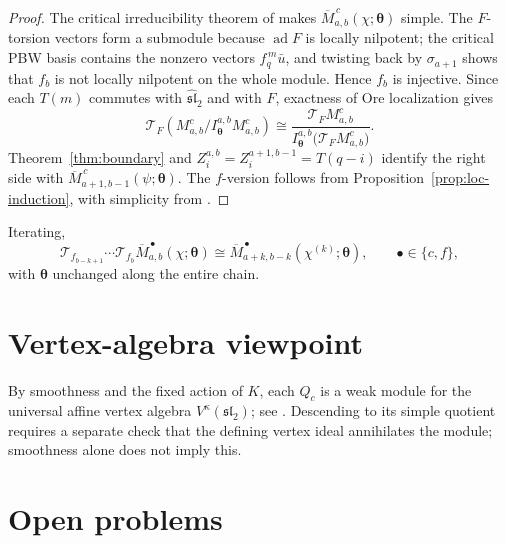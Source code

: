 \documentclass[11pt,a4paper]{article}
\newcommand{\slc}{\mathfrak{sl}_2}
\newcommand{\slh}{\widehat{\mathfrak{sl}}_2}
\newcommand{\ad}{\operatorname{ad}}
\newcommand{\T}{\mathcal T}
\theoremstyle{plainupright}
\begin{document}
\begin{proof}
The critical irreducibility theorem of \cite{FGXZ} makes
\(\overline M^{\,c}_{a,b}(\chi;\boldsymbol\theta)\) simple. The \(F\)-torsion
vectors form a submodule because \(\ad F\) is locally nilpotent; the critical
PBW basis contains the nonzero vectors \(f_q^{\,m}\bar u\), and twisting back
by \(\sigma_{a+1}\) shows that \(f_b\) is not locally nilpotent on the whole
module. Hence \(f_b\) is injective. Since each \(T(m)\) commutes with \(\slh\)
and with \(F\), exactness of Ore localization gives
\[
\T_F\!\left(M^c_{a,b}/I^{a,b}_{\boldsymbol\theta}M^c_{a,b}\right)
\cong
\frac{\T_FM^c_{a,b}}{I^{a,b}_{\boldsymbol\theta}\bigl(\T_FM^c_{a,b}\bigr)}.
\]
Theorem~\ref{thm:boundary} and \(Z_i^{a,b}=Z_i^{a+1,b-1}=T(q-i)\) identify the
right side with \(\overline M^{\,c}_{a+1,b-1}(\psi;\boldsymbol\theta)\). The
\(f\)-version follows from Proposition~\ref{prop:loc-induction}, with
simplicity from \cite[Theorem 4.2]{FGXZ}.
\end{proof}

Iterating,
\[
\T_{f_{b-k+1}}\cdots\T_{f_b}
\overline M^{\,\bullet}_{a,b}(\chi;\boldsymbol\theta)
\cong
\overline M^{\,\bullet}_{a+k,b-k}(\chi^{(k)};\boldsymbol\theta),
\qquad \bullet\in\{c,f\},
\]
with \(\boldsymbol\theta\) unchanged along the entire chain.

\section{Vertex-algebra viewpoint}\label{sec:vertex}

By smoothness and the fixed action of \(K\), each \(Q_c\) is a weak module for
the universal affine vertex algebra \(V^\kappa(\slc)\); see
\cite[Section 2]{FGXZ}. Descending to its simple quotient requires a separate
check that the defining vertex ideal annihilates the module; smoothness alone
does not imply this.

\section{Open problems}\label{sec:open}
\end{document}
